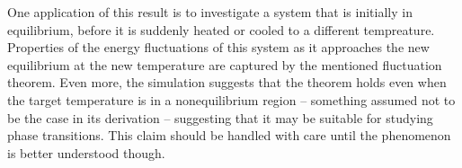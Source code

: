 One application of this result is to investigate a system that is initially in equilibrium, before it is suddenly heated or cooled to a different tempreature. Properties of the energy fluctuations of this system as it approaches the new equilibrium at the new temperature are captured by the mentioned fluctuation theorem. Even more, the simulation suggests that the theorem holds even when the target temperature is in a nonequilibrium region -- something assumed not to be the case in its derivation -- suggesting that it may be suitable for studying phase transitions. This claim should be handled with care until the phenomenon is better understood though.



